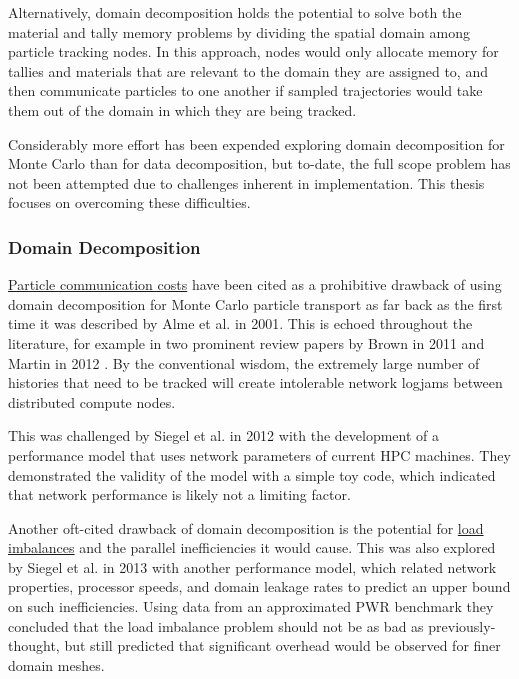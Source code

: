 \documentclass[12pt,twoside]{mitthesis-exec}
\begin{document}
Alternatively, domain decomposition holds the potential to solve both the
material and tally memory problems by dividing the spatial domain among particle
tracking nodes. In this approach, nodes would only allocate
memory for tallies and materials that are relevant to the domain they are
assigned to, and then communicate particles to one another if sampled
trajectories would take them out of the domain in which they are being tracked.

Considerably more effort has been expended exploring domain decomposition for
Monte Carlo than for data decomposition, but to-date, the full scope
problem has not been attempted due to challenges
inherent in implementation. This thesis focuses on overcoming these
difficulties.

\subsubsection*{Domain Decomposition}

\underline{Particle communication costs} have been cited as a prohibitive
drawback of using domain decomposition for Monte Carlo particle transport as far
back as the first time it was described by Alme et al. \cite{js-alme-2001} in
2001. This is echoed throughout the literature, for example in two prominent
review papers by Brown in 2011 \cite{forrest_mc_prospects} and Martin in 2012
\cite{martin_chall}. By the conventional wisdom, the extremely large number of
histories that need to be tracked will create intolerable network logjams
between distributed compute nodes.

This was challenged by Siegel et al. in 2012 \cite{Siegel1} with the
development of a performance model that uses network parameters of current
HPC machines. They demonstrated the validity of the model with a simple toy
code, which indicated that network performance is likely not a limiting factor.

Another oft-cited drawback of domain decomposition is the potential for
\ul{load imbalances} and the parallel inefficiencies it would cause.
This was also explored by Siegel et al. in 2013 \cite{Siegel2} with another
performance model, which related network properties, processor speeds, and
domain leakage rates to predict an upper bound on such inefficiencies. Using
data from an approximated PWR benchmark they concluded that the load imbalance
problem should not be as bad as previously-thought, but still predicted that
significant overhead would be observed for finer domain meshes.
\end{document}
